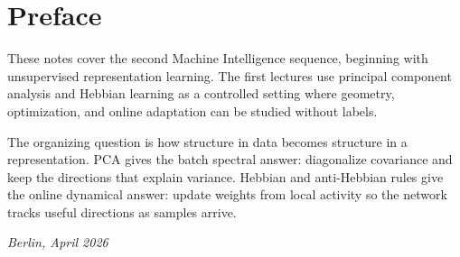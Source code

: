 \section*{Preface}

These notes cover the second Machine Intelligence sequence, beginning with unsupervised representation learning. The first lectures use principal component analysis and Hebbian learning as a controlled setting where geometry, optimization, and online adaptation can be studied without labels.

The organizing question is how structure in data becomes structure in a representation. PCA gives the batch spectral answer: diagonalize covariance and keep the directions that explain variance. Hebbian and anti-Hebbian rules give the online dynamical answer: update weights from local activity so the network tracks useful directions as samples arrive.

\bigskip
\noindent\textit{Berlin, April 2026}
